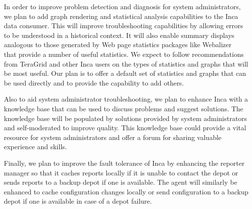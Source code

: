 \documentclass[times,10pt,twocolumn]{article}
\begin{document}

In order to improve problem detection and diagnosis for system administrators,
we plan to add graph rendering and statistical
analysis capabilities to the Inca data consumer.  This will improve troubleshooting capabilities by
allowing errors to be understood in a historical context.  It will also enable
summary displays analogous to those generated by Web page statistics packages
like Webalizer~\cite{webalizer} that provide a number of useful
statistics.  We expect to follow recommendations from TeraGrid and other Inca
users on the types of statistics and graphs that will be most useful.
Our plan is to offer a default set of statistics and graphs that can be used
directly and to provide the capability to add others.

Also to aid system administrator troubleshooting,
we plan to enhance Inca with a knowledge base that can be used to
discuss problems and suggest solutions.
The knowledge base will be populated by solutions provided by
system administrators and self-moderated to
improve quality.
This knowledge base could provide a vital resource
for system administrators and offer a forum for sharing
valuable experience and skills.   

Finally, we plan to improve the fault tolerance of Inca by enhancing the
reporter manager so that it caches reports locally if it is unable to
contact the depot or sends reports to a backup depot if one is available.
The agent will similarly be enhanced to cache configuration changes locally or
send configuration to a backup depot if one is available in case of a depot
failure.

\end{document}

